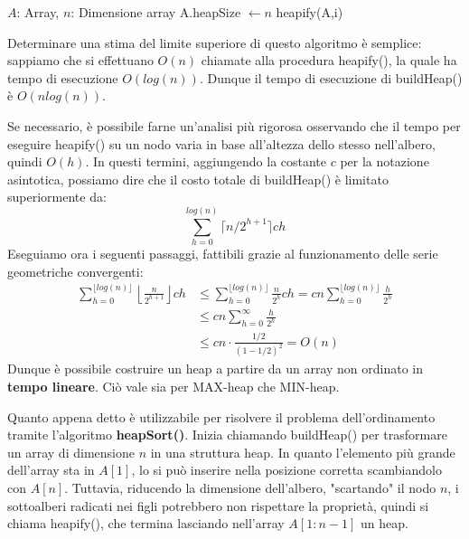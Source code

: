 \begin{algorithm}[H]
	\caption{buildHeap(A, n)}
	\begin{algorithmic}[i]
		\Require $A$: Array, $n$: Dimensione array
		\State A.heapSize $\gets n$
		 
		\State heapify(A,i)
		\EndFor
	\end{algorithmic}
\end{algorithm}
\noindent Determinare una stima del limite superiore di questo algoritmo è semplice: sappiamo che si effettuano $O(n)$ chiamate alla procedura heapify(), la quale ha tempo di esecuzione $O(log(n))$. Dunque il tempo di esecuzione di buildHeap() è $O(nlog(n))$.\par
Se necessario, è possibile farne un'analisi più rigorosa osservando che il tempo per eseguire heapify() su un nodo varia in base all'altezza dello stesso nell'albero, quindi $O(h)$. In questi termini, aggiungendo la costante $c$ per la notazione asintotica, possiamo dire che il costo totale di buildHeap() è limitato superiormente da: \[\sum_{h=0}^{log(n)}\lceil n/2^{h+1}\rceil ch\]
\noindent Eseguiamo ora i seguenti passaggi, fattibili grazie al funzionamento delle serie geometriche convergenti: \begin{equation}
	\begin{split}
		\sum_{h=0}^{\lfloor log(n)\rfloor} \left\lfloor \frac{n}{2^{h+1}}\right\rfloor ch &\leq \sum_{h=0}^{\lfloor log(n)\rfloor} \frac{n}{2^h}ch = cn\sum_{h=0}^{\lfloor log(n)\rfloor} \frac{h}{2^h}\\
		 &\leq cn \sum_{h=0}^{\infty}\frac{h}{2^h}\\
		 &\leq cn\cdot \frac{1/2}{(1 - 1/2)^2} = O(n)
	\end{split}
\end{equation}
\noindent Dunque è possibile costruire un heap a partire da un array non ordinato in \textbf{tempo lineare}. Ciò vale sia per MAX-heap che MIN-heap.\par
Quanto appena detto è utilizzabile per risolvere il problema dell'ordinamento tramite l'algoritmo \textbf{heapSort()}. Inizia chiamando buildHeap() per trasformare un array di dimensione $n$ in una struttura heap. In quanto l'elemento più grande dell'array sta in $A[1]$, lo si può inserire nella posizione corretta scambiandolo con $A[n]$. Tuttavia, riducendo la dimensione dell'albero, "scartando" il nodo $n$, i sottoalberi radicati nei figli potrebbero non rispettare la proprietà, quindi si chiama heapify(), che termina lasciando nell'array $A[1:n-1]$ un heap.\par
